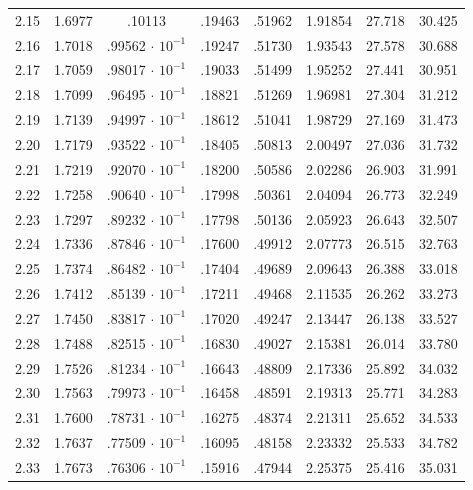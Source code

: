 \begin{minipage}{0.435\textwidth}
{\begin{tabular}{c|c|c|c|c|c|c|c}
        2.15 & 1.6977 & .10113 & .19463 & .51962 & 1.91854 & 27.718 & 30.425 \\
        2.16 & 1.7018 & .99562$\,\cdot\,10^{-1}$ & .19247 & .51730 & 1.93543 & 27.578 & 30.688 \\
        2.17 & 1.7059 & .98017$\,\cdot\,10^{-1}$ & .19033 & .51499 & 1.95252 & 27.441 & 30.951 \\
        2.18 & 1.7099 & .96495$\,\cdot\,10^{-1}$ & .18821 & .51269 & 1.96981 & 27.304 & 31.212 \\
        2.19 & 1.7139 & .94997$\,\cdot\,10^{-1}$ & .18612 & .51041 & 1.98729 & 27.169 & 31.473 \\
        2.20 & 1.7179 & .93522$\,\cdot\,10^{-1}$ & .18405 & .50813 & 2.00497 & 27.036 & 31.732 \\
        2.21 & 1.7219 & .92070$\,\cdot\,10^{-1}$ & .18200 & .50586 & 2.02286 & 26.903 & 31.991 \\
        2.22 & 1.7258 & .90640$\,\cdot\,10^{-1}$ & .17998 & .50361 & 2.04094 & 26.773 & 32.249 \\
        2.23 & 1.7297 & .89232$\,\cdot\,10^{-1}$ & .17798 & .50136 & 2.05923 & 26.643 & 32.507 \\
        2.24 & 1.7336 & .87846$\,\cdot\,10^{-1}$ & .17600 & .49912 & 2.07773 & 26.515 & 32.763 \\
        2.25 & 1.7374 & .86482$\,\cdot\,10^{-1}$ & .17404 & .49689 & 2.09643 & 26.388 & 33.018 \\
        2.26 & 1.7412 & .85139$\,\cdot\,10^{-1}$ & .17211 & .49468 & 2.11535 & 26.262 & 33.273 \\
        2.27 & 1.7450 & .83817$\,\cdot\,10^{-1}$ & .17020 & .49247 & 2.13447 & 26.138 & 33.527 \\
        2.28 & 1.7488 & .82515$\,\cdot\,10^{-1}$ & .16830 & .49027 & 2.15381 & 26.014 & 33.780 \\
        2.29 & 1.7526 & .81234$\,\cdot\,10^{-1}$ & .16643 & .48809 & 2.17336 & 25.892 & 34.032 \\
        2.30 & 1.7563 & .79973$\,\cdot\,10^{-1}$ & .16458 & .48591 & 2.19313 & 25.771 & 34.283 \\
        2.31 & 1.7600 & .78731$\,\cdot\,10^{-1}$ & .16275 & .48374 & 2.21311 & 25.652 & 34.533 \\
        2.32 & 1.7637 & .77509$\,\cdot\,10^{-1}$ & .16095 & .48158 & 2.23332 & 25.533 & 34.782 \\
        2.33 & 1.7673 & .76306$\,\cdot\,10^{-1}$ & .15916 & .47944 & 2.25375 & 25.416 & 35.031 \\

\end{tabular}}
\end{minipage}
